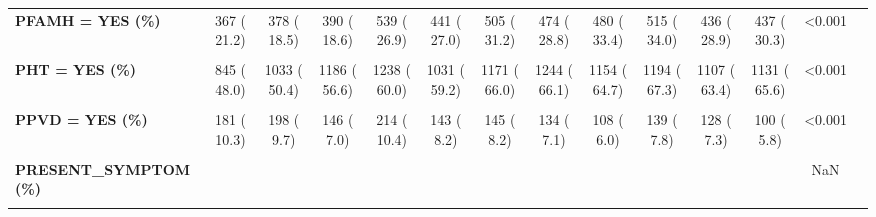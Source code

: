 \documentclass[
]{article}
\begin{document}
\begin{table}[H]
\begin{tabular}[t]{>{\raggedright\arraybackslash}p{5em}ccccccccccccc}
\textbf{PFAMH = YES (\%)} & 367 ( 21.2) & 378 ( 18.5) & 390 ( 18.6) & 539 ( 26.9) & 441 ( 27.0) & 505 ( 31.2) & 474 ( 28.8) & 480 ( 33.4) & 515 ( 34.0) & 436 ( 28.9) & 437 ( 30.3) & <0.001 & \\
\textbf{\cellcolor{gray!10}{PHLIP = YES (\%)}} & \cellcolor{gray!10}{913 ( 52.0)} & \cellcolor{gray!10}{1112 ( 54.3)} & \cellcolor{gray!10}{1035 ( 49.4)} & \cellcolor{gray!10}{1356 ( 65.8)} & \cellcolor{gray!10}{1294 ( 74.5)} & \cellcolor{gray!10}{1337 ( 75.3)} & \cellcolor{gray!10}{1423 ( 75.9)} & \cellcolor{gray!10}{1295 ( 72.7)} & \cellcolor{gray!10}{1259 ( 71.0)} & \cellcolor{gray!10}{1228 ( 70.4)} & \cellcolor{gray!10}{1314 ( 76.2)} & \cellcolor{gray!10}{<0.001} & \cellcolor{gray!10}{}\\
\textbf{PHT = YES (\%)} & 845 ( 48.0) & 1033 ( 50.4) & 1186 ( 56.6) & 1238 ( 60.0) & 1031 ( 59.2) & 1171 ( 66.0) & 1244 ( 66.1) & 1154 ( 64.7) & 1194 ( 67.3) & 1107 ( 63.4) & 1131 ( 65.6) & <0.001 & \\
\textbf{\cellcolor{gray!10}{PMI = YES (\%)}} & \cellcolor{gray!10}{523 ( 29.6)} & \cellcolor{gray!10}{558 ( 27.2)} & \cellcolor{gray!10}{580 ( 27.7)} & \cellcolor{gray!10}{626 ( 30.2)} & \cellcolor{gray!10}{539 ( 30.9)} & \cellcolor{gray!10}{567 ( 32.0)} & \cellcolor{gray!10}{572 ( 30.4)} & \cellcolor{gray!10}{662 ( 37.2)} & \cellcolor{gray!10}{690 ( 38.8)} & \cellcolor{gray!10}{651 ( 37.3)} & \cellcolor{gray!10}{642 ( 37.2)} & \cellcolor{gray!10}{<0.001} & \cellcolor{gray!10}{}\\
\textbf{PPVD = YES (\%)} & 181 ( 10.3) & 198 (  9.7) & 146 (  7.0) & 214 ( 10.4) & 143 (  8.2) & 145 (  8.2) & 134 (  7.1) & 108 (  6.0) & 139 (  7.8) & 128 (  7.3) & 100 (  5.8) & <0.001 & \\
\textbf{\cellcolor{gray!10}{PRENAL = YES (\%)}} & \cellcolor{gray!10}{144 (  8.2)} & \cellcolor{gray!10}{173 (  8.4)} & \cellcolor{gray!10}{202 (  9.6)} & \cellcolor{gray!10}{263 ( 12.8)} & \cellcolor{gray!10}{216 ( 12.4)} & \cellcolor{gray!10}{213 ( 12.0)} & \cellcolor{gray!10}{238 ( 12.6)} & \cellcolor{gray!10}{203 ( 11.4)} & \cellcolor{gray!10}{203 ( 11.4)} & \cellcolor{gray!10}{184 ( 10.5)} & \cellcolor{gray!10}{180 ( 10.4)} & \cellcolor{gray!10}{<0.001} & \cellcolor{gray!10}{}\\
\textbf{PRESENT\_SYMPTOM (\%)} &  &  &  &  &  &  &  &  &  &  &  & NaN & \\
\textbf{\cellcolor{gray!10}{ATYPICAL COMPLAINTS}} & \cellcolor{gray!10}{306 ( 17.1)} & \cellcolor{gray!10}{289 ( 14.3)} & \cellcolor{gray!10}{944 ( 45.3)} & \cellcolor{gray!10}{819 ( 40.8)} & \cellcolor{gray!10}{236 ( 13.6)} & \cellcolor{gray!10}{242 ( 13.8)} & \cellcolor{gray!10}{171 (  9.1)} & \cellcolor{gray!10}{282 ( 16.1)} & \cellcolor{gray!10}{0 (  NaN)} & \cellcolor{gray!10}{0 (  NaN)} & \cellcolor{gray!10}{0 (  NaN)} & \cellcolor{gray!10}{} & \cellcolor{gray!10}{}\\

\end{tabular}
\end{table}
\end{document}
